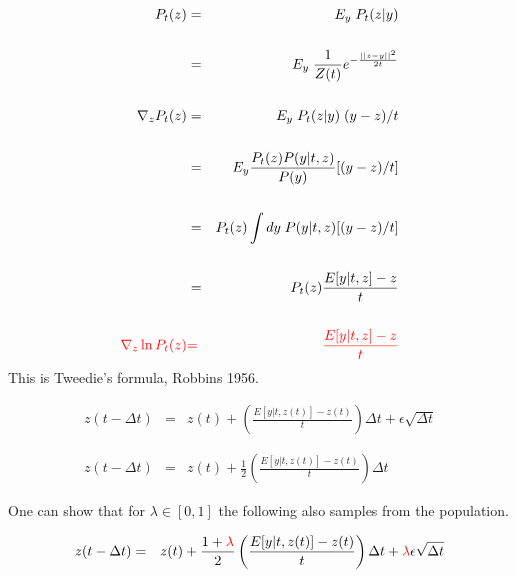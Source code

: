 {
{\Large
\begin{eqnarray*}
  P_t(z) & = & E_y \;P_t(z|y) \\
  \\
  & = & \;E_y\;\frac{1}{Z(t)} e^{-\frac{||z-y||^2}{2t}} \\
  \\
  \nabla_z P_t(z) & = & E_y \;P_t(z|y)\; (y-z)/t \\
  \\
  & = & E_y\frac{P_t(z)P(y|t,z)}{P(y)}[(y-z)/t] \\
  \\
    & = & P_t(z)\int dy\; P(y|t,z)[(y-z)/t] \\
  \\
  & = & P_t(z)\frac{E[y|t,z]-z}{t} \\
  \\
   {\color{red} \nabla_z \ln P_t(z)}&  {\color{red}  =} & {\color{red}\frac{E[y|t,z]-z}{t}}
  \end{eqnarray*}
}
This is Tweedie's formula, Robbins 1956.


\begin{eqnarray*}
z(t - \Delta t) & = & z(t) + \left(\frac{E[y|t,z(t)] - z(t)}{t}\right)\Delta t + \epsilon\sqrt{\Delta t} \\
\\
\\
z(t -\Delta t) & = & z(t) + \frac{1}{2}\left(\frac{E[y|t,z(t)] - z(t)}{t}\right)\Delta t
\end{eqnarray*}

One can show that for {\color{red} $\lambda \in [0,1]$} the following also samples from the population.

\begin{eqnarray*}
z(t -\Delta t) & = & z(t) + \frac{1+{\color{red} \lambda}}{2}\left(\frac{E[y|t,z(t)] - z(t)}{t}\right)\Delta t + {\color{red} \lambda} \epsilon\sqrt{\Delta t}
\end{eqnarray*}


}




